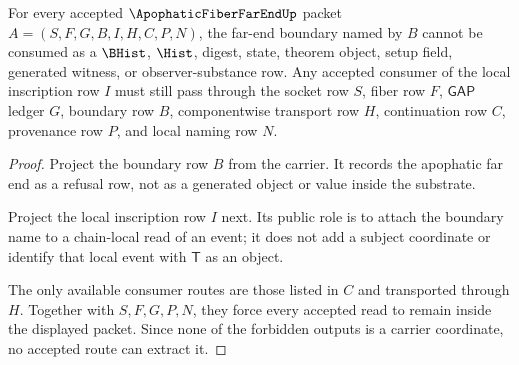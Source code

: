 \begin{theorem}
\label{thm:apophatic-fiber-far-end-noninternality}
For every accepted $\ApophaticFiberFarEndUp$ packet $A=(S,F,G,B,I,H,C,P,N)$, the far-end boundary named by $B$ cannot be consumed as a $\BHist$, $\Hist$, digest, state, theorem object, setup field, generated witness, or observer-substance row. Any accepted consumer of the local inscription row $I$ must still pass through the socket row $S$, fiber row $F$, $\mathsf{GAP}$ ledger $G$, boundary row $B$, componentwise transport row $H$, continuation row $C$, provenance row $P$, and local naming row $N$.
\end{theorem}
\begin{proof}
Project the boundary row $B$ from the carrier. It records the apophatic far end as a refusal row, not as a generated object or value inside the substrate.

Project the local inscription row $I$ next. Its public role is to attach the boundary name to a chain-local read of an event; it does not add a subject coordinate or identify that local event with $\mathsf{T}$ as an object.

The only available consumer routes are those listed in $C$ and transported through $H$. Together with $S,F,G,P,N$, they force every accepted read to remain inside the displayed packet. Since none of the forbidden outputs is a carrier coordinate, no accepted route can extract it.
\end{proof}

